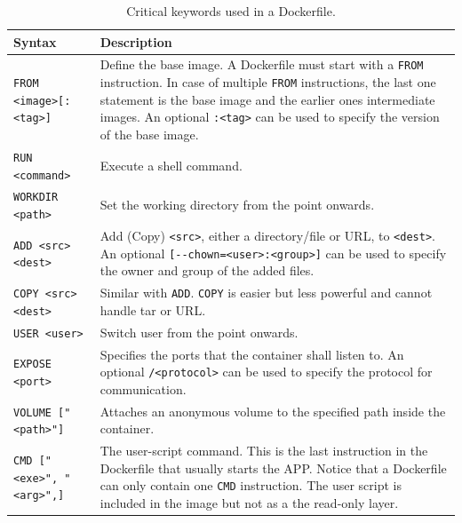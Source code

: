 \begin{table}[!htb]
	\centering \caption{Critical keywords used in a Dockerfile.}\label{ch:vac:tab:keywordsdockerfile}
	\begin{tabularx}{\textwidth}{lX}
		\hline
		Syntax & Description \\ \hline
		\verb|FROM <image>[:<tag>]| & Define the base image. A Dockerfile must start with a \verb|FROM| instruction. In case of multiple \verb|FROM| instructions, the last one statement is the base image and the earlier ones intermediate images. An optional \verb|:<tag>| can be used to specify the version of the base image. \\ 
		\verb|RUN <command>| & Execute a shell command. \\ 
		\verb|WORKDIR <path>| & Set the working directory from the point onwards. \\ 
		\verb|ADD <src> <dest>| & Add (Copy) \verb|<src>|, either a directory/file or URL, to \verb|<dest>|. An optional \verb|[--chown=<user>:<group>]| can be used to specify the owner and group of the added files. \\ 
		\verb|COPY <src> <dest>| & Similar with \verb|ADD|. \verb|COPY| is easier but less powerful and cannot handle tar or URL. \\ 
		\verb|USER <user>| & Switch user from the point onwards. \\ 
		\verb|EXPOSE <port>| & Specifies the ports that the container shall listen to. An optional \verb|/<protocol>| can be used to specify the protocol for communication. \\
        \verb|VOLUME ["<path>"]| & Attaches an anonymous volume to the specified path inside the container. \\
		\verb|CMD ["<exe>", "<arg>",]| & The user-script command. This is the last instruction in the Dockerfile that usually starts the APP. Notice that a Dockerfile can only contain one \verb|CMD| instruction. The user script is included in the image but not as a the read-only layer. \\
		\hline
	\end{tabularx}
\end{table}


